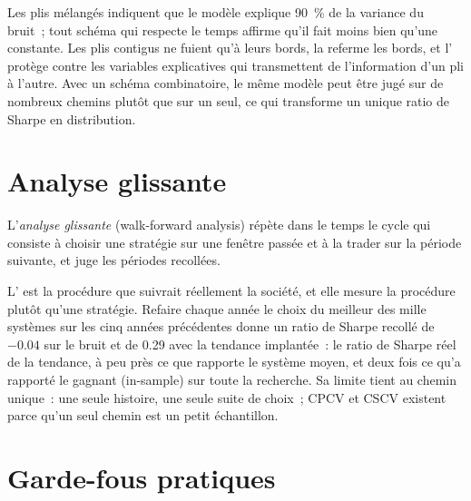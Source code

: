 Les plis mélangés indiquent que le modèle explique 90~\% de la variance du bruit~; tout schéma qui respecte le temps affirme qu'il fait moins bien qu'une constante. Les plis contigus
ne fuient qu'à leurs bords, la  referme les bords, et l' protège contre les variables explicatives qui transmettent de l'information d'un pli à l'autre. Avec un
schéma combinatoire, le même modèle peut être jugé sur de nombreux chemins plutôt que sur un seul, ce qui transforme un unique ratio de Sharpe  en distribution.

\section{Analyse glissante}

\begin{definition}\label{def:rs:overfitting:walkforward}
L'\emph{analyse glissante} (walk-forward analysis) répète dans le temps le cycle qui consiste à choisir une stratégie sur une fenêtre passée et à la trader sur la
période suivante, et juge les périodes  recollées.
\end{definition}

L' est la procédure que suivrait réellement la société, et elle mesure la procédure plutôt qu'une stratégie. Refaire chaque année le choix du meilleur des mille
systèmes sur les cinq années précédentes donne un ratio de Sharpe recollé de $-0.04$ sur le bruit et de 0.29 avec la tendance implantée~: le ratio de Sharpe réel de la tendance,
à peu près ce que rapporte le système moyen, et deux fois ce qu'a rapporté le gagnant  (in-sample) sur toute la recherche. Sa limite tient au chemin unique~: une seule histoire, une seule suite de
choix~; CPCV et CSCV existent parce qu'un seul chemin est un petit échantillon.

\section{Garde-fous pratiques}

